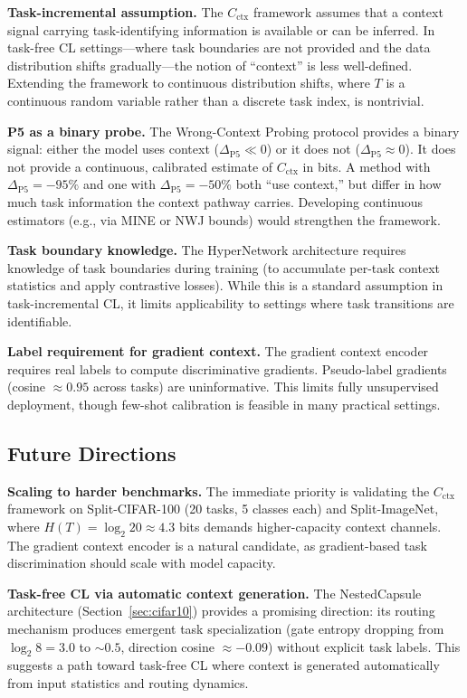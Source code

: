 \documentclass{article}
\begin{document}
\textbf{Task-incremental assumption.} The $C_\mathrm{ctx}$ framework assumes that a context signal carrying task-identifying information is available or can be inferred. In task-free CL settings---where task boundaries are not provided and the data distribution shifts gradually---the notion of ``context'' is less well-defined. Extending the framework to continuous distribution shifts, where $T$ is a continuous random variable rather than a discrete task index, is nontrivial.

\textbf{P5 as a binary probe.} The Wrong-Context Probing protocol provides a binary signal: either the model uses context ($\Delta_\mathrm{P5} \ll 0$) or it does not ($\Delta_\mathrm{P5} \approx 0$). It does not provide a continuous, calibrated estimate of $C_\mathrm{ctx}$ in bits. A method with $\Delta_\mathrm{P5} = -95\%$ and one with $\Delta_\mathrm{P5} = -50\%$ both ``use context,'' but differ in how much task information the context pathway carries. Developing continuous estimators (e.g., via MINE \citep{belghazi2018mine} or NWJ bounds) would strengthen the framework.

\textbf{Task boundary knowledge.} The HyperNetwork architecture requires knowledge of task boundaries during training (to accumulate per-task context statistics and apply contrastive losses). While this is a standard assumption in task-incremental CL, it limits applicability to settings where task transitions are identifiable.

\textbf{Label requirement for gradient context.} The gradient context encoder requires real labels to compute discriminative gradients. Pseudo-label gradients (cosine $\approx 0.95$ across tasks) are uninformative. This limits fully unsupervised deployment, though few-shot calibration is feasible in many practical settings.

\subsection{Future Directions}
\label{sec:future}

\textbf{Scaling to harder benchmarks.} The immediate priority is validating the $C_\mathrm{ctx}$ framework on Split-CIFAR-100 (20 tasks, 5 classes each) and Split-ImageNet, where $H(T) = \log_2 20 \approx 4.3$ bits demands higher-capacity context channels. The gradient context encoder is a natural candidate, as gradient-based task discrimination should scale with model capacity.

\textbf{Task-free CL via automatic context generation.} The NestedCapsule architecture (Section~\ref{sec:cifar10}) provides a promising direction: its routing mechanism produces emergent task specialization (gate entropy dropping from $\log_2 8 = 3.0$ to $\sim 0.5$, direction cosine $\approx -0.09$) without explicit task labels. This suggests a path toward task-free CL where context is generated automatically from input statistics and routing dynamics.
\end{document}
